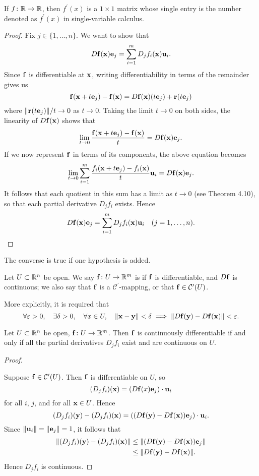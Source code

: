 \begin{remark}
If $f\colon\mathbb R\to\mathbb R$, then $f^\prime(x)$ is a $1\times1$ matrix whose single entry is the number denoted as $f^\prime(x)$ in single-variable calculus.
\end{remark}

\begin{proof}
Fix $j\in\{1,\dots,n\}$. We want to show that
\[D\vb{f}(\vb{x})\vb{e}_j=\sum_{i=1}^{m}D_jf_i(\vb{x})\vb{u}_i.\]
Since $\vb{f}$ is differentiable at $\vb{x}$, writing differentiability in terms of the remainder gives us
\[\vb{f}(\vb{x}+t\vb{e}_j)-\vb{f}(\vb{x})=D\vb{f}(\vb{x})(t\vb{e}_j)+\vb{r}(t\vb{e}_j)\]
where $\norm{\vb{r}(t\vb{e}_j)}/t\to0$ as $t\to0$. Taking the limit $t\to0$ on both sides, the linearity of $D\vb{f}(\vb{x})$ shows that
\[\lim_{t\to0}\frac{\vb{f}(\vb{x}+t\vb{e}_j)-\vb{f}(\vb{x})}{t}=D\vb{f}(\vb{x})\vb{e}_j.\]
If we now represent $\vb{f}$ in terms of its components, the above equation becomes
\[\lim_{t\to0}\sum_{i=1}^{m}\frac{f_i(\vb{x}+t\vb{e}_j)-f_i(\vb{x})}{t}\vb{u}_i=D\vb{f}(\vb{x})\vb{e}_j.\]
It follows that each quotient in this sum has a limit as $t\to0$ (see Theorem 4.10), so that each partial derivative $D_jf_i$ exists.
Hence
\[D\vb{f}(\vb{x})\vb{e}_j=\sum_{i=1}^{m}D_jf_i(\vb{x})\vb{u}_i\quad(j=1,\dots,n).\]
\end{proof}

The converse is true if one hypothesis is added.

Let $U\subset\mathbb R^n$ be open. 
We say $\vb{f}\colon U\to\mathbb R^m$ is  if $\vb{f}$ is differentiable, and $D\vb{f}$ is continuous; we also say that $\vb{f}$ is a $\mathcal{C}^\prime$-mapping, or that $\vb{f}\in\mathcal{C}^\prime(U)$.

More explicitly, it is required that
\[\forall\varepsilon>0,\quad\exists\delta>0,\quad\forall x\in U,\quad\norm{\vb{x}-\vb{y}}<\delta\implies\norm{D\vb{f}(\vb{y})-D\vb{f}(\vb{x})}<\varepsilon.\]

\begin{theorem}
Let $U\subset\mathbb R^n$ be open, $\vb{f}\colon U\to\mathbb R^m$. Then $\vb{f}$ is continuously differentiable if and only if all the partial derivatives $D_jf_i$ exist and are continuous on $U$.
\end{theorem}

\begin{proof} \

\forward Suppose $\vb{f}\in\mathcal{C}^\prime(U)$. Then $\vb{f}$ is differentiable on $U$, so
\[(D_jf_i)(\vb{x})=(D\vb{f}(x)\vb{e}_j)\cdot\vb{u}_i\]
for all $i$, $j$, and for all $\vb{x}\in U$. Hence
\[(D_jf_i)(\vb{y})-(D_jf_i)(\vb{x})=\left((D\vb{f}(\vb{y})-D\vb{f}(\vb{x}))\vb{e}_j\right)\cdot\vb{u}_i.\]
Since $\norm{\vb{u}_i}=\norm{\vb{e}_j}=1$, it follows that
\begin{align*}
\norm{(D_jf_i)(\vb{y})-(D_jf_i)(\vb{x})}
&\le\norm{(D\vb{f}(\vb{y})-D\vb{f}(\vb{x}))\vb{e}_j}\\
&\le\norm{D\vb{f}(\vb{y})-D\vb{f}(\vb{x})}.
\end{align*}
Hence $D_jf_i$ is continuous.

\backward  
\end{proof}
\pagebreak

